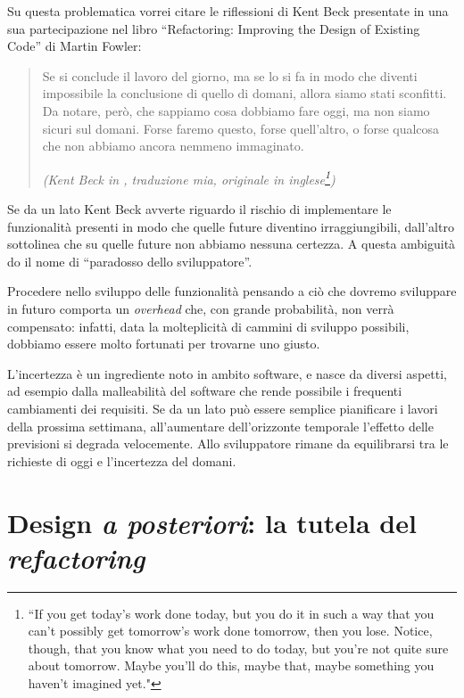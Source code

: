 \documentclass[12pt]{report}
\begin{document}
Su questa problematica vorrei citare le riflessioni di Kent Beck
presentate in una sua partecipazione nel libro ``Refactoring: Improving the 
Design of Existing Code'' di Martin Fowler\cite{fowler2002}:


\begin{quote}
	
	Se si conclude il lavoro del giorno, ma se lo si fa in modo che diventi 
	impossibile la conclusione di quello di domani, allora siamo stati sconfitti.
	Da notare, però, che sappiamo cosa dobbiamo fare oggi, ma non siamo 
	sicuri sul domani. Forse faremo questo, forse quell'altro, o forse qualcosa
	che non abbiamo ancora nemmeno immaginato.
	
	\flushright
	\textit{(Kent Beck in \cite{fowler2002}, traduzione mia, originale in inglese\footnote{
			``If you get today's work done today, but you do it in such a way 
			that you can't possibly get tomorrow's work done tomorrow, then 
			you lose. Notice, though, that you know what you need to do today, 
			but you're not quite sure about tomorrow. Maybe you'll do this, 
			maybe that, maybe something you haven't imagined yet."
		})
	}
\end{quote}

Se da un lato Kent Beck avverte riguardo il rischio di implementare le 
funzionalità presenti in modo che quelle future diventino irraggiungibili,
dall'altro sottolinea che su quelle future non abbiamo nessuna certezza. 
A questa ambiguità do il nome di ``paradosso dello sviluppatore''.

Procedere nello sviluppo delle funzionalità pensando a ciò che dovremo
sviluppare in futuro comporta un \textit{overhead} che, con
grande probabilità, non verrà compensato: infatti, data la molteplicità
di cammini di sviluppo possibili, dobbiamo essere molto fortunati per
trovarne uno giusto.

L'incertezza è un ingrediente noto in ambito software, e nasce da diversi
aspetti, ad esempio dalla malleabilità del software che rende possibile
i frequenti cambiamenti dei requisiti. Se da un lato può essere semplice 
pianificare i lavori della prossima settimana, all'aumentare dell'orizzonte 
temporale l'effetto delle previsioni si degrada velocemente. Allo 
sviluppatore rimane da equilibrarsi tra le richieste di oggi e l'incertezza
del domani.

\section{Design \textit{a posteriori}: la tutela del \textit{refactoring}}
\end{document}
